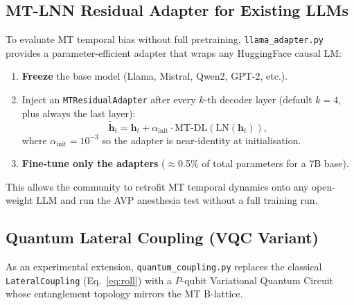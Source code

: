 \documentclass[11pt]{article}
\theoremstyle{definition}
\newcommand{\vh}{\mathbf{h}}
\begin{document}
\subsection{MT-LNN Residual Adapter for Existing LLMs}
\label{sec:adapter}

To evaluate MT temporal bias without full pretraining, \texttt{llama\_adapter.py} provides a parameter-efficient adapter that wraps any HuggingFace causal LM:
\begin{enumerate}[noitemsep]
  \item \textbf{Freeze} the base model (Llama, Mistral, Qwen2, GPT-2, etc.).
  \item Inject an \texttt{MTResidualAdapter} after every $k$-th decoder layer (default $k=4$, plus always the last layer):
  \begin{equation}
    \tilde{\vh}_t = \vh_t + \alpha_\text{init}\cdot\mathrm{MT\text{-}DL}(\mathrm{LN}(\vh_t)),
    \label{eq:adapter}
  \end{equation}
  where $\alpha_\text{init}=10^{-3}$ so the adapter is near-identity at initialisation.
  \item \textbf{Fine-tune only the adapters} ($\approx$0.5\% of total parameters for a 7B base).
\end{enumerate}
This allows the community to retrofit MT temporal dynamics onto any open-weight LLM and run the AVP anesthesia test without a full training run.

\subsection{Quantum Lateral Coupling (VQC Variant)}
\label{sec:quantum}

As an experimental extension, \texttt{quantum\_coupling.py} replaces the classical \texttt{LateralCoupling} (Eq.\ \ref{eq:roll}) with a $P$-qubit Variational Quantum Circuit whose entanglement topology mirrors the MT B-lattice.
\end{document}

